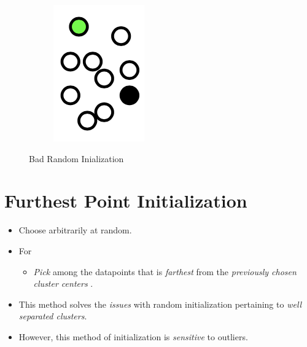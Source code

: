 \documentclass[
	number={6},
	title={Clustering}
]{cs584notes}
\begin{document}
\begin{figure}[H]
\begin{subfigure}[m]{0.1\textwidth}
		\includegraphics[width=\textwidth]{figures/6/bad_random_initalization_2}
	\end{subfigure}
	\caption{Bad Random Inialization}
	\label{fig:bad-random-initalization}
\end{figure}


\section{Furthest Point Initialization}\label{sec:furthest-point-initialization}
\begin{itemize}
	\item Choose  arbitrarily at random.
	\item For 
	\begin{itemize}
		\item \emph{Pick}  among the datapoints  that is \emph{farthest} from the \emph{previously chosen cluster centers} .
	\end{itemize}
	\item This method solves the \emph{issues} with random initialization pertaining to \emph{well separated clusters}.
	\item However, this method of initialization is \emph{sensitive} to outliers.
\end{itemize}
\end{document}
